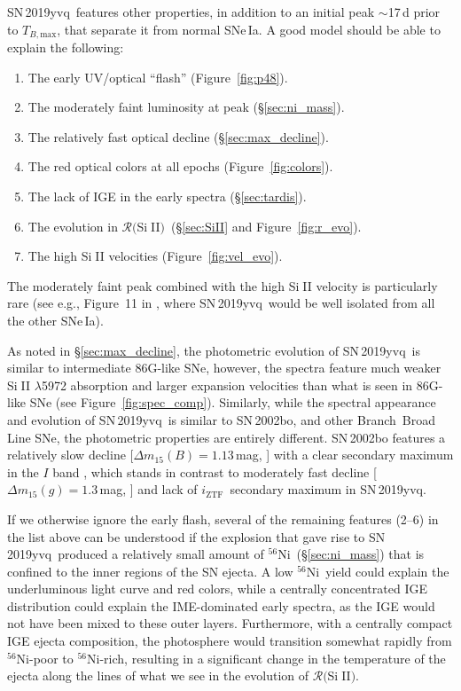 \documentclass[twocolumn]{aastex63}
\def\ion#1#2{#1$\;${\footnotesize\rm{#2}}\relax}
\newcommand{\todo}[1]{{\color{magenta} to-do: {#1}}}
\newcommand{\iztf}{$i_\mathrm{ZTF}$}
\newcommand{\tbmax}{$T_{B,\mathrm{max}}$}
\newcommand{\RSiII}{$\mathcal{R}($\ion{Si}{II}$)$}
\newcommand{\radni}{$^{56}$Ni}
\newcommand{\sn}{SN\,2019yvq}
\begin{document}
\sn\ features other properties, in addition to an initial peak $\sim$17\,d
prior to \tbmax, that separate it from normal SNe\,Ia. A good model should be
able to explain the following:
%
\begin{enumerate}
    \item The early UV/optical ``flash'' (Figure~\ref{fig:p48}).
    \item The moderately faint luminosity at peak  (\S\ref{sec:ni_mass}). 
    \item The relatively fast optical decline (\S\ref{sec:max_decline}). 
    \item The red optical colors at all epochs (Figure~\ref{fig:colors}). 
    \item The lack of IGE in the early spectra (\S\ref{sec:tardis}).
    \item The evolution in \RSiII\ (\S\ref{sec:SiII} and Figure~\ref{fig:r_evo}).
    \item The high \ion{Si}{II} velocities (Figure~\ref{fig:vel_evo}).
\end{enumerate}
%
The moderately faint peak combined with the high \ion{Si}{II} velocity is
particularly rare (see e.g., Figure~11 in \citealt{Polin19}, where \sn\ would
be well isolated from all the other SNe\,Ia).

As noted in \S\ref{sec:max_decline}, the photometric evolution of \sn\ is
similar to intermediate 86G-like SNe, however, the spectra feature much weaker
\ion{Si}{II} $\lambda$5972 absorption and larger expansion velocities than
what is seen in 86G-like SNe (see Figure~\ref{fig:spec_comp}). Similarly,
while the spectral appearance and evolution of \sn\ is similar to SN\,2002bo,
and other Branch~Broad Line SNe, the photometric properties are entirely
different. SN\,2002bo features a relatively slow decline [$\Delta{m}_{15}(B) =
1.13$\,mag, ] with a clear secondary maximum
in the $I$ band \citep{Benetti04}, which stands in contrast to moderately fast
decline [$\Delta{m}_{15}(g) = 1.3$\,mag, ] and lack of \iztf\ secondary maximum
in \sn.

If we otherwise ignore the early flash, several of the remaining features
(2--6) in the list above can be understood if the explosion that gave rise to
\sn\ produced a relatively small amount of \radni\ (\S\ref{sec:ni_mass}) that
is confined to the inner regions of the SN ejecta. A low \radni\ yield could
explain the underluminous light curve and red colors, while a centrally
concentrated IGE distribution could explain the IME-dominated early spectra,
as the IGE would not have been mixed to these outer layers. Furthermore, with
a centrally compact IGE ejecta composition, the photosphere would transition
somewhat rapidly from \radni-poor to \radni-rich, resulting in a significant
change in the temperature of the ejecta along the lines of what we see in the
evolution of \RSiII.
\end{document}
